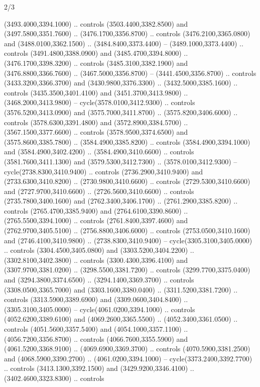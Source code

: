 \begin{flagdescription}{2/3}
\begin{scope}[shift={(0.5\flaglength,0.5)},scale=\flagwidth/130]
\begin{scope}[y=0.01mm, x=0.01mm,shift={(-3365,-2250)}]
  (3493.4000,3394.1000) .. controls (3503.4400,3382.8500) and
  (3497.5800,3351.7600) .. (3476.1700,3356.8700) .. controls
  (3476.2100,3365.0800) and (3488.0100,3362.1500) .. (3484.8400,3373.4400) --
  (3489.1000,3373.4400) .. controls (3491.4800,3388.0900) and
  (3485.4700,3394.8000) .. (3476.1700,3398.3200) .. controls
  (3485.3100,3382.1900) and (3476.8800,3366.7600) .. (3467.5000,3356.8700) --
  (3441.4500,3356.8700) .. controls (3433.3200,3366.3700) and
  (3430.9800,3376.3300) .. (3432.5000,3385.1600) .. controls
  (3435.3500,3401.4100) and (3451.3700,3413.9800) .. (3468.2000,3413.9800) --
  cycle(3578.0100,3412.9300) .. controls (3576.5200,3413.0900) and
  (3575.7000,3411.8700) .. (3575.8200,3406.6000) .. controls
  (3578.6300,3391.4800) and (3572.8900,3384.5700) .. (3567.1500,3377.6600) ..
  controls (3578.9500,3374.6500) and (3575.8600,3385.7800) ..
  (3584.4900,3385.8200) .. controls (3584.4900,3394.1000) and
  (3584.4900,3402.4200) .. (3584.4900,3410.6600) .. controls
  (3581.7600,3411.1300) and (3579.5300,3412.7300) .. (3578.0100,3412.9300) --
  cycle(2738.8300,3410.9400) .. controls (2736.2900,3410.9400) and
  (2733.6300,3410.8200) .. (2730.9800,3410.6600) .. controls
  (2729.5300,3410.6600) and (2727.9700,3410.6600) .. (2726.5600,3410.6600) ..
  controls (2735.7800,3400.1600) and (2762.3400,3406.1700) ..
  (2761.2900,3385.8200) .. controls (2765.4700,3385.9400) and
  (2764.6100,3390.8600) .. (2765.5500,3394.1000) .. controls
  (2761.8400,3397.4600) and (2762.9700,3405.5100) .. (2756.8800,3406.6000) ..
  controls (2753.0500,3410.1600) and (2746.4100,3410.9800) ..
  (2738.8300,3410.9400) -- cycle(3305.3100,3405.0000) .. controls
  (3304.4500,3405.0800) and (3303.5200,3404.2200) .. (3302.8100,3402.3800) ..
  controls (3300.4300,3396.4100) and (3307.9700,3381.0200) ..
  (3298.5500,3381.7200) .. controls (3299.7700,3375.0400) and
  (3294.3800,3374.6500) .. (3294.1400,3369.3700) .. controls
  (3308.0500,3365.7000) and (3303.1600,3380.0400) .. (3311.5200,3381.7200) ..
  controls (3313.5900,3389.6900) and (3309.0600,3404.8400) ..
  (3305.3100,3405.0000) -- cycle(4061.0200,3394.1000) .. controls
  (4052.6200,3389.6100) and (4069.2600,3365.5500) .. (4052.3400,3361.0500) ..
  controls (4051.5600,3357.5400) and (4054.1000,3357.1100) ..
  (4056.7200,3356.8700) .. controls (4066.7600,3355.5900) and
  (4061.5200,3368.9100) .. (4069.6900,3369.3700) .. controls
  (4070.5900,3381.2500) and (4068.5900,3390.2700) .. (4061.0200,3394.1000) --
  cycle(3373.2400,3392.7700) .. controls (3413.1300,3392.1500) and
  (3429.9200,3346.4100) .. (3402.4600,3323.8300) .. controls

\end{scope}
\end{scope}
\end{flagdescription}
